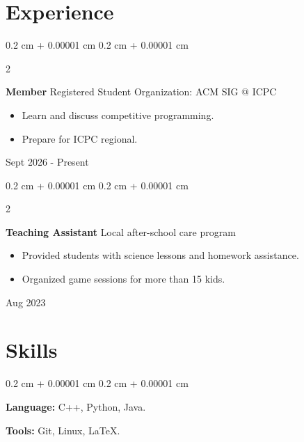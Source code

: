 \documentclass[11pt, letterpaper]{article}
\newenvironment{highlights}{
    \begin{itemize}[
        topsep=0.10 cm,
        parsep=0.10 cm,
        partopsep=0pt,
        itemsep=0pt,
        leftmargin=0.4 cm + 10pt
    ]
}{
    \end{itemize}
} %
\newenvironment{onecolentry}{
    \begin{adjustwidth}{
        0.2 cm + 0.00001 cm
    }{
        0.2 cm + 0.00001 cm
    }
}{
    \end{adjustwidth}
} %
\newenvironment{twocolentry}[2][]{
    \onecolentry
    \def\secondColumn{#2}
    \setcolumnwidth{\fill, 4.5 cm}
    \begin{paracol}{2}
}{
    \switchcolumn \raggedleft \secondColumn
    \end{paracol}
    \endonecolentry
} %
\begin{document}
    
    \section{Experience}    

        \begin{twocolentry}{ Sept 2026 - Present}
            \textbf{Member} Registered Student Organization: ACM SIG @ ICPC

            \begin{highlights}
                \item Learn and discuss competitive programming.
                \item Prepare for ICPC regional.
            \end{highlights}
        \end{twocolentry}

        \begin{twocolentry}{ Aug 2023 }
            \textbf{Teaching Assistant} Local after-school care program

            \begin{highlights}
                \item Provided students with science lessons and homework assistance.
                \item Organized game sessions for more than 15 kids.
            \end{highlights}
        \end{twocolentry}
    
    

        

    \section{Skills}

    \begin{onecolentry}

        \textbf{Language:} C++, Python, Java.

        \vspace{5pt}

        \textbf{Tools:} Git, Linux, \LaTeX.
    \end{onecolentry}
\end{document}
